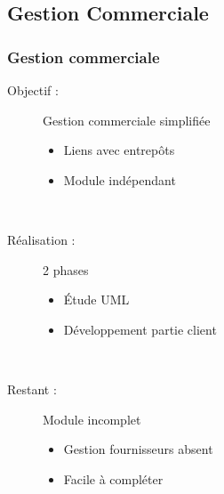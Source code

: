 \subsection{Gestion Commerciale}

\begin{frame}
	\frametitle{Gestion commerciale}

	\begin{description}
		\item[Objectif :] Gestion commerciale simplifiée
			\begin{itemize}
				\item Liens avec entrepôts
				\item Module indépendant
			\end{itemize}~

		\item[Réalisation : ] 2 phases
			\begin{itemize}
				\item Étude UML
				\item Développement partie client
			\end{itemize}~

		\item[Restant :] Module incomplet
			\begin{itemize}
				\item Gestion fournisseurs absent
				\item Facile à compléter
			\end{itemize}
	\end{description}
\end{frame}
